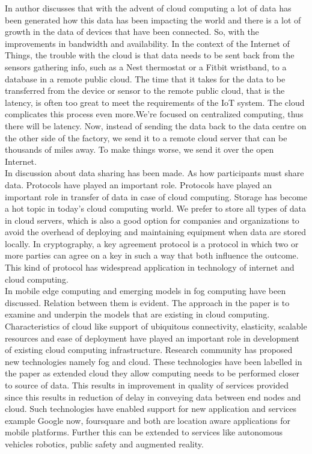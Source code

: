In \cite{linthicum2017connecting} author discusses that with the advent of cloud computing a lot of data has been generated how this data has been impacting the world and there is a lot of growth in the data of devices that have been connected. So, with the improvements in bandwidth and availability. In the context of the Internet of Things, the trouble with the cloud is that data needs to be sent back from the sensors gathering info, such as a Nest thermostat or a Fitbit wristband, to a database in a remote public cloud. The time that it takes for the data to be transferred from the device or sensor to the remote public cloud, that is the latency, is often too great to meet the requirements of the IoT system. The cloud complicates this process even more.We’re focused on centralized computing, thus there will be latency. Now, instead of sending the data back to the data centre on the other side of the factory, we send it to a remote cloud server that can be thousands of miles away. To make things worse, we send it over the open Internet.\\
In \cite{shen2017block} discussion about data sharing has been made. As how participants must share data. Protocols have played an important role. Protocols have played an important role in transfer of data in case of cloud computing. Storage has become a hot topic in today’s cloud computing world. We prefer to store all types of data in cloud servers, which is also a good option for companies and organizations to avoid the overhead of deploying and maintaining equipment when data are stored locally. In cryptography, a key agreement protocol is a protocol in which two or more parties can agree on a key in such a way that both influence the outcome.  This kind of protocol has widespread application in technology of internet and cloud computing.\\
In \cite{shirazi2017extended} mobile edge computing and emerging models in fog computing have been discussed. Relation between them is evident. The approach in the paper is to examine and underpin the models that are existing in cloud computing. Characteristics of cloud like support of ubiquitous connectivity, elasticity, scalable resources and ease of deployment have played an important role in development of existing cloud computing infrastructure. Research community has proposed new technologies namely fog and cloud. These technologies have been labelled in the paper as extended cloud they allow computing needs to be performed closer to source of data. This results in improvement in quality of services provided since this results in reduction of delay in conveying data between end nodes and cloud. Such technologies have enabled support for new application and services example Google now, foursquare and both are location aware applications for mobile platforms. Further this can be extended to services like autonomous vehicles robotics, public safety and augmented reality.

